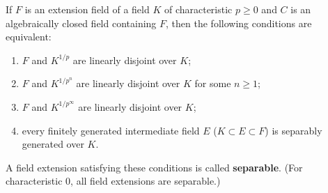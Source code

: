 If $F$ is an extension field of a field $K$ of characteristic $p \geq 0$ and $C$ is an algebraically closed field containing $F$, then the following conditions are equivalent:
\begin{enumerate}
\item[(i)] $F$ and $K^{1/p}$ are linearly disjoint over $K$;
\item[(ii)] $F$ and $K^{1/p^n}$ are linearly disjoint over $K$ for some $n \geq 1$;
\item[(iii)] $F$ and $K^{1/p^\infty}$ are linearly disjoint over $K$;
\item[(iv)] every finitely generated intermediate field $E$ ($K \subset E \subset F$) is separably generated over $K$.
\end{enumerate}
A field extension satisfying these conditions is called \textbf{separable}.
(For characteristic $0$, all field extensions are separable.)
